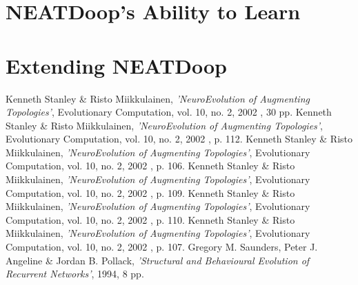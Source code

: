 \documentclass[]{Learning-to-Play-Wolfenstein-thesis}
\begin{document}
\section{NEATDoop's Ability to Learn}
\section{Extending NEATDoop}

\newpage
\begin{thebibliography}{99}
 Kenneth Stanley \& Risto Miikkulainen, \emph{'NeuroEvolution of Augmenting Topologies'}, Evolutionary Computation, vol. 10, no. 2, 2002 , 30 pp.
 Kenneth Stanley \& Risto Miikkulainen, \emph{'NeuroEvolution of Augmenting Topologies'}, Evolutionary Computation, vol. 10, no. 2, 2002 , p. 112.
Kenneth Stanley \& Risto Miikkulainen, \emph{'NeuroEvolution of Augmenting Topologies'}, Evolutionary Computation, vol. 10, no. 2, 2002 , p. 106.
 Kenneth Stanley \& Risto Miikkulainen, \emph{'NeuroEvolution of Augmenting Topologies'}, Evolutionary Computation, vol. 10, no. 2, 2002 , p. 109.
 Kenneth Stanley \& Risto Miikkulainen, \emph{'NeuroEvolution of Augmenting Topologies'}, Evolutionary Computation, vol. 10, no. 2, 2002 , p. 110.
 Kenneth Stanley \& Risto Miikkulainen, \emph{'NeuroEvolution of Augmenting Topologies'}, Evolutionary Computation, vol. 10, no. 2, 2002 , p. 107.
 Gregory M. Saunders, Peter J. Angeline \& Jordan B. Pollack, \emph{'Structural and Behavioural Evolution of Recurrent Networks'}, 1994, 8 pp. 
\end{thebibliography}
\label{endpage}
\end{document}
